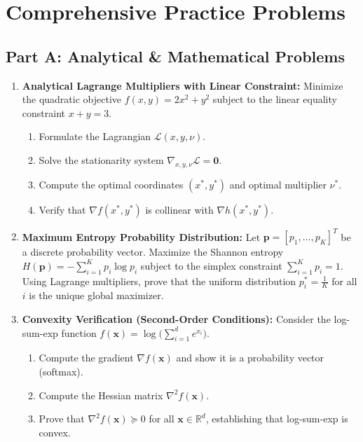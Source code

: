 \section{Comprehensive Practice Problems}

\subsection*{Part A: Analytical \& Mathematical Problems}

\begin{enumerate}[label=\textbf{P\arabic*.}]
    \item \textbf{Analytical Lagrange Multipliers with Linear Constraint:}
    Minimize the quadratic objective $f(x, y) = 2x^2 + y^2$ subject to the linear equality constraint $x + y = 3$.
    \begin{enumerate}[label=(\alph*)]
        \item Formulate the Lagrangian $\mathcal{L}(x, y, \nu)$.
        \item Solve the stationarity system $\nabla_{x, y, \nu} \mathcal{L} = \mathbf{0}$.
        \item Compute the optimal coordinates $(x^*, y^*)$ and optimal multiplier $\nu^*$.
        \item Verify that $\nabla f(x^*, y^*)$ is collinear with $\nabla h(x^*, y^*)$.
    \end{enumerate}

    \item \textbf{Maximum Entropy Probability Distribution:}
    Let $\mathbf{p} = [p_1, \dots, p_K]^T$ be a discrete probability vector. Maximize the Shannon entropy $H(\mathbf{p}) = -\sum_{i=1}^K p_i \log p_i$ subject to the simplex constraint $\sum_{i=1}^K p_i = 1$.
    Using Lagrange multipliers, prove that the uniform distribution $p_i^* = \frac{1}{K}$ for all $i$ is the unique global maximizer.

    \item \textbf{Convexity Verification (Second-Order Conditions):}
    Consider the log-sum-exp function $f(\mathbf{x}) = \log\big( \sum_{i=1}^d e^{x_i} \big)$.
    \begin{enumerate}[label=(\alph*)]
        \item Compute the gradient $\nabla f(\mathbf{x})$ and show it is a probability vector (softmax).
        \item Compute the Hessian matrix $\nabla^2 f(\mathbf{x})$.
        \item Prove that $\nabla^2 f(\mathbf{x}) \succeq 0$ for all $\mathbf{x} \in \mathbb{R}^d$, establishing that log-sum-exp is convex.
    \end{enumerate}


\end{enumerate}
